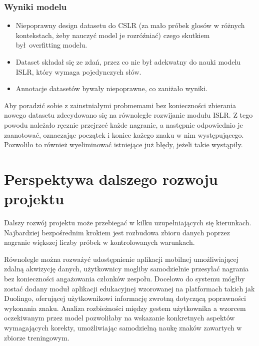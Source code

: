\documentclass[12pt]{article}
\begin{document}
\subsubsection{Wyniki modelu}
\begin{itemize}
    \item Niepoprawny design datasetu do CSLR (za mało próbek glosów w różnych kontekstach, żeby nauczyć model je rozróźniać) czego skutkiem był overfitting modelu. 
    \item Dataset składał się ze zdań, przez co nie był adekwatny do nauki modelu ISLR, który wymaga pojedynczych słów.
    \item Annotacje datasetów bywały niepoprawne, co zaniżało wyniki. 
\end{itemize}

Aby poradzić sobie z zainstniałymi probmemami bez konieczności zbierania nowego datasetu zdecydowano się na równoległe rozwijanie modułu ISLR. Z tego powodu należało ręcznie przejrzeć każde nagranie, a następnie odpowiednio je zaanotować, oznaczając początek i koniec każego znaku w nim występującego. Pozwoliło to również wyeliminować istniejące już błędy, jeżeli takie wystąpiły.

\section{Perspektywa dalszego rozwoju projektu}

Dalszy rozwój projektu może przebiegać w kilku uzupełniających się kierunkach. 
Najbardziej bezpośrednim krokiem jest rozbudowa zbioru danych poprzez nagranie większej liczby próbek w kontrolowanych warunkach.

Równolegle można rozważyć udostępnienie aplikacji mobilnej umożliwiającej zdalną akwizycję danych, użytkownicy mogliby samodzielnie przesyłać nagrania bez konieczności angażowania członków zespołu.
Docelowo do systemu mógłby zostać dodany  moduł aplikacji edukacyjnej wzorowanej na platformach takich jak Duolingo, oferującej użytkownikowi informację zwrotną dotyczącą poprawności wykonania znaku.
Analiza rozbieżności między gestem użytkownika a wzorcem oczekiwanym przez model pozwoliłaby na wskazanie konkretnych aspektów wymagających korekty, umożliwiając samodzielną naukę znaków zawartych w zbiorze treningowym.

\clearpage

\printbibliography
\end{document}
